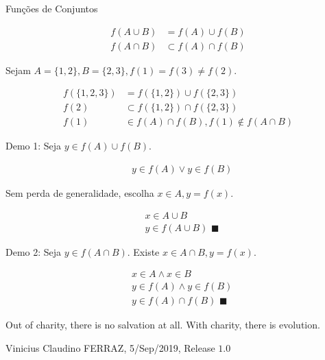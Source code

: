 \documentclass[12pt]{article}
\begin{document}
\Large

\begin{center}
Fun\c{c}\~oes de Conjuntos
\end{center}

\normalsize

\begin{align}
 f(A \cup B) &= f(A) \cup f(B) \\
 f(A \cap B) &\subset f(A) \cap f(B)
\end{align}

Sejam $A = \{ 1, 2 \}, B = \{ 2, 3\}, f(1) = f(3) \ne f(2)$.

\begin{align}
 f(\{ 1, 2, 3 \}) &= f(\{ 1, 2 \}) \cup f(\{ 2, 3 \}) \\
 f(2) &\subset f(\{ 1, 2 \}) \cap f(\{ 2, 3 \}) \\
 f(1) &\in f(A) \cap f(B), f(1) \notin f(A \cap B)
\end{align}

Demo 1: Seja $y \in f(A) \cup f(B)$.

\begin{align}
  &y \in f(A) \vee y \in f(B)
\end{align}

Sem perda de generalidade, escolha $x \in A, y = f(x)$.

\begin{align}
  &x \in A \cup B \\
  &y \in f(A \cup B)\,\,\blacksquare
\end{align}

\vspace{3mm}

Demo 2: Seja $y \in f(A \cap B)$. Existe $x \in A \cap B, y = f(x)$.

\begin{align}
  &x \in A \wedge x \in B \\
  &y \in f(A) \wedge y \in f(B) \\
  &y \in f(A) \cap f(B)\,\,\blacksquare
\end{align}

\vspace{3mm}

Out of charity, there is no salvation at all. With charity, there is evolution.

\vspace{3mm}

Vinicius Claudino FERRAZ, 5/Sep/2019, Release $1.0$
\end{document}
